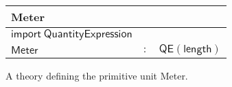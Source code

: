 \begin{figure}[h]
  \begin{center}
    \begin{tabular}{|l c l|}
      \hline
      \textsf{Meter} & &\\\hline
      $ \mathsf{import \ Quantity Expression}$ &&\\
      \hline
      $\mathsf{Meter}$ & $:$ & $ \mathsf{QE} \left( \mathsf{length} \right)$\\\hline
    \end{tabular}
  \end{center}

  \caption{A theory defining the primitive unit Meter. }
  \label{fig:meter}
\end{figure}
